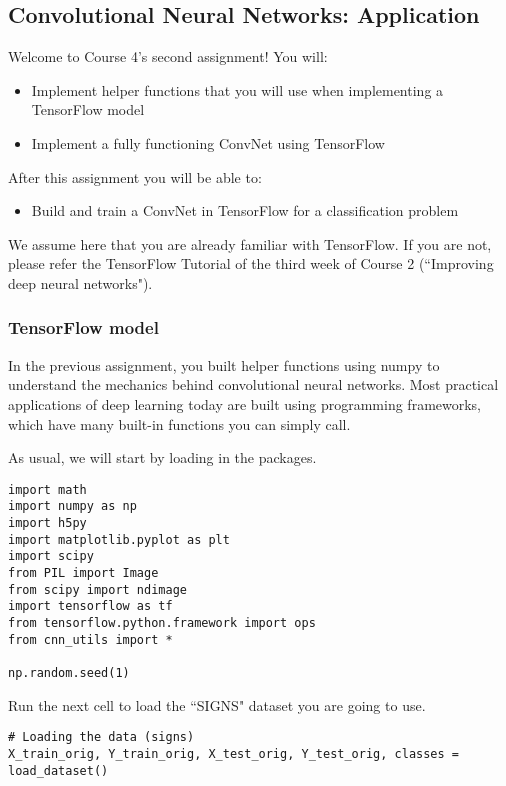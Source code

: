 \subsection{Convolutional Neural Networks: Application}

Welcome to Course 4's second assignment! You will:
\begin{itemize}
\item Implement helper functions that you will use when implementing a TensorFlow model
\item Implement a fully functioning ConvNet using TensorFlow
\end{itemize}

After this assignment you will be able to:
\begin{itemize}
\item Build and train a ConvNet in TensorFlow for a classification problem
\end{itemize}

We assume here that you are already familiar with TensorFlow. If you are not, please refer the TensorFlow Tutorial of the third week of Course 2 (``Improving deep neural networks").


\subsubsection{TensorFlow model}
In the previous assignment, you built helper functions using numpy to understand the mechanics behind convolutional neural networks. Most practical applications of deep learning today are built using programming frameworks, which have many built-in functions you can simply call.

As usual, we will start by loading in the packages.

\begin{verbatim}
import math
import numpy as np
import h5py
import matplotlib.pyplot as plt
import scipy
from PIL import Image
from scipy import ndimage
import tensorflow as tf
from tensorflow.python.framework import ops
from cnn_utils import *

np.random.seed(1)
\end{verbatim}

Run the next cell to load the ``SIGNS" dataset you are going to use.
\begin{verbatim}
# Loading the data (signs)
X_train_orig, Y_train_orig, X_test_orig, Y_test_orig, classes = load_dataset()
\end{verbatim}

